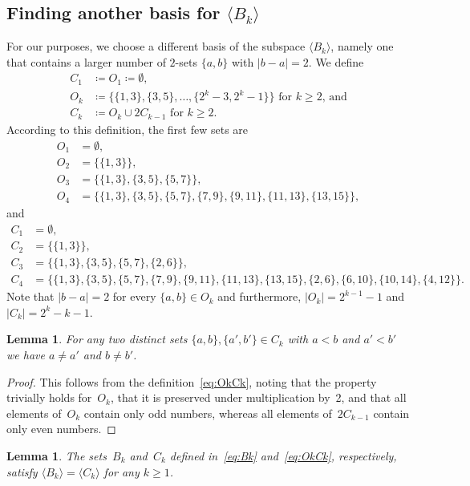 \documentclass[11pt]{article}
\newtheorem{lemma}[theorem]{Lemma}
\newcommand{\ass}{\coloneqq}
\begin{document}
\subsection{Finding another basis for $\langle B_k\rangle$}
%
For our purposes, we choose a different basis of the subspace $\langle B_k\rangle$, namely one that contains a larger number of $2$-sets $\{a,b\}$ with $|b-a|=2$.
We define
\begin{equation}
\label{eq:OkCk}
\begin{split}
C_1&\ass O_1\ass \emptyset,\\
O_k&\ass \{\{1,3\},\{3,5\},\ldots,\{2^k-3,2^k-1\}\} \text{ for $k\geq 2$, and} \\
C_k& \ass O_k\cup 2C_{k-1} \text{ for } k\geq 2.
\end{split}
\end{equation}
According to this definition, the first few sets are
\[
\begin{split}
O_1&=\emptyset, \\
O_2&=\{\{1,3\}\}, \\
O_3&=\{\{1,3\},\{3,5\},\{5,7\}\}, \\
O_4&=\{\{1,3\},\{3,5\},\{5,7\},\{7,9\},\{9,11\},\{11,13\},\{13,15\}\},
\end{split}
\]
and
\[
\label{eq:C14}
\begin{split}
C_1&=\emptyset, \\
C_2&=\{\{1,3\}\}, \\
C_3&=\{\{1,3\},\{3,5\},\{5,7\},\{2,6\}\}, \\
C_4&=\{\{1,3\},\{3,5\},\{5,7\},\{7,9\},\{9,11\},\{11,13\},\{13,15\},\{2,6\},\{6,10\},\{10,14\},\{4,12\}\}.
\end{split}
\]
%
Note that $|b-a|=2$ for every $\{a,b\}\in O_k$ and furthermore, $|O_k|=2^{k-1}-1$ and $|C_k|=2^k-k-1$.
%
\begin{lemma}
\label{lem:Cdiff}
For any two distinct sets $\{a,b\},\{a',b'\}\in C_k$ with $a<b$ and $a'<b'$ we have $a \ne a'$ and $b\ne b'$.
\end{lemma}
%
\begin{proof}
This follows from the definition~\eqref{eq:OkCk}, noting that the property trivially holds for~$O_k$, that it is preserved under multiplication by~2, and that all elements of~$O_k$ contain only odd numbers, whereas all elements of~$2C_{k-1}$ contain only even numbers.
\end{proof}
%
\begin{lemma}
\label{lem:BkCk}
The sets~$B_k$ and~$C_k$ defined in~\eqref{eq:Bk} and~\eqref{eq:OkCk}, respectively, satisfy $\langle B_k\rangle=\langle C_k\rangle$ for any $k\geq 1$.
\end{lemma}
\end{document}
